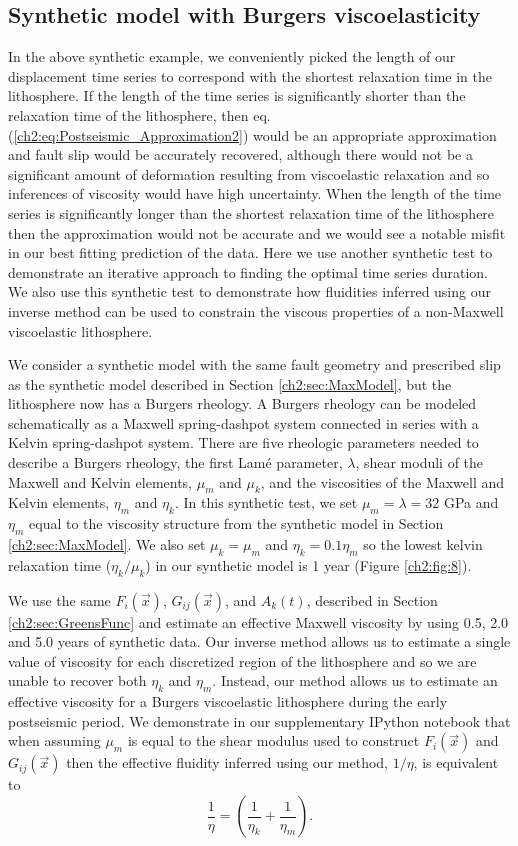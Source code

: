 \subsection{Synthetic model with Burgers viscoelasticity}\label{ch2:sec:BurgersModel}
In the above synthetic example, we conveniently picked the length of
our displacement time series to correspond with the shortest
relaxation time in the lithosphere.  If the length of the time series
is significantly shorter than the relaxation time of the lithosphere,
then eq. (\ref{ch2:eq:Postseismic_Approximation2}) would be an appropriate
approximation and fault slip would be accurately recovered, although
there would not be a significant amount of deformation resulting from
viscoelastic relaxation and so inferences of viscosity would have high
uncertainty.  When the length of the time series is significantly
longer than the shortest relaxation time of the lithosphere then the
approximation would not be accurate and we would see a notable misfit
in our best fitting prediction of the data. Here we use another
synthetic test to demonstrate an iterative approach to finding the
optimal time series duration. We also use this synthetic test to
demonstrate how fluidities inferred using our inverse method can be
used to constrain the viscous properties of a non-Maxwell viscoelastic
lithosphere.

We consider a synthetic model with the same fault geometry and
prescribed slip as the synthetic model described in Section
\ref{ch2:sec:MaxModel}, but the lithosphere now has a Burgers
rheology.  A Burgers rheology can be modeled schematically as a
Maxwell spring-dashpot system connected in series with a Kelvin
spring-dashpot system. There are five rheologic parameters needed to
describe a Burgers rheology, the first Lam\'e parameter, $\lambda$,
shear moduli of the Maxwell and Kelvin elements, $\mu_m$ and $\mu_k$,
and the viscosities of the Maxwell and Kelvin elements, $\eta_m$ and
$\eta_k$. In this synthetic test, we set $\mu_m=\lambda=32$ GPa and
$\eta_m$ equal to the viscosity structure from the synthetic model in
Section \ref{ch2:sec:MaxModel}.  We also set $\mu_k=\mu_m$ and
$\eta_k=0.1\eta_m$ so the lowest kelvin relaxation time
($\eta_k/\mu_k$) in our synthetic model is 1 year (Figure
\ref{ch2:fig:8}).

We use the same $F_i(\vec{x})$, $G_{ij}(\vec{x})$, and $A_k(t)$,
described in Section \ref{ch2:sec:GreensFunc} and estimate an
effective Maxwell viscosity by using 0.5, 2.0 and 5.0 years of
synthetic data. Our inverse method allows us to estimate a single
value of viscosity for each discretized region of the lithosphere and
so we are unable to recover both $\eta_k$ and $\eta_m$.  Instead, our
method allows us to estimate an effective viscosity for a Burgers
viscoelastic lithosphere during the early postseismic period.  We
demonstrate in our supplementary IPython notebook that when assuming
$\mu_m$ is equal to the shear modulus used to construct $F_i(\vec{x})$
and $G_{ij}(\vec{x})$ then the effective fluidity inferred using our
method, $1/\eta$, is equivalent to
\begin{equation}\label{ch2:eq:EquivalentBurgers} \frac{1}{\eta} =
\left(\frac{1}{\eta_k} + \frac{1}{\eta_m}\right). \end{equation}

